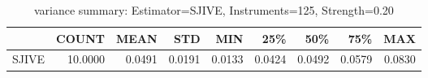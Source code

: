\begin{table}[ht]
\centering
\caption{variance summary: Estimator=SJIVE, Instruments=125, Strength=0.20}
\begin{tabular}{lrrrrrrrr}
\toprule
 & COUNT & MEAN & STD & MIN & 25\% & 50\% & 75\% & MAX \\
\midrule
SJIVE & 10.0000 & 0.0491 & 0.0191 & 0.0133 & 0.0424 & 0.0492 & 0.0579 & 0.0830 \\
\bottomrule
\end{tabular}
\end{table}
